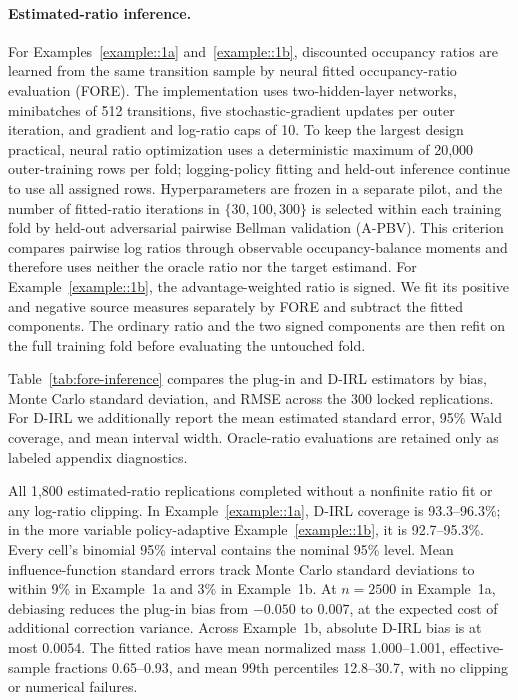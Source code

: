 \documentclass[12pt]{article}
\theoremstyle{plain}
\begin{document}
\paragraph{Estimated-ratio inference.}
For Examples~\ref{example::1a} and~\ref{example::1b}, discounted occupancy
ratios are learned from the same transition sample by neural fitted
occupancy-ratio evaluation (FORE). The implementation uses two-hidden-layer
networks, minibatches of 512 transitions, five stochastic-gradient updates per
outer iteration, and gradient and log-ratio caps of 10. To keep the largest
design practical, neural ratio optimization uses a deterministic maximum of
20,000 outer-training rows per fold; logging-policy fitting and held-out
inference continue to use all assigned rows.
Hyperparameters are frozen in a separate pilot, and the number of fitted-ratio
iterations in $\{30,100,300\}$ is selected within each training fold by held-out adversarial pairwise
Bellman validation (A-PBV). This criterion compares pairwise log ratios through
observable occupancy-balance moments and therefore uses neither the oracle
ratio nor the target estimand. For Example~\ref{example::1b}, the
advantage-weighted ratio is signed. We fit its positive and negative source
measures separately by FORE and subtract the fitted components. The ordinary
ratio and the two signed components are then refit on the full training fold
before evaluating the untouched fold.

Table~\ref{tab:fore-inference} compares the plug-in and D-IRL estimators by
bias, Monte Carlo standard deviation, and RMSE across the 300 locked
replications. For D-IRL we additionally report the mean estimated standard
error, 95\% Wald coverage, and mean interval width. Oracle-ratio evaluations
are retained only as labeled appendix diagnostics.


All 1,800 estimated-ratio replications completed without a nonfinite ratio fit
or any log-ratio clipping. In Example~\ref{example::1a}, D-IRL coverage is
93.3--96.3\%; in the more variable policy-adaptive
Example~\ref{example::1b}, it is 92.7--95.3\%. Every cell's binomial 95\%
interval contains the nominal 95\% level. Mean influence-function standard
errors track Monte Carlo standard deviations to within 9\% in Example~1a and
3\% in Example~1b. At $n=2500$ in Example~1a, debiasing reduces the plug-in
bias from $-0.050$ to $0.007$, at the expected cost of additional correction
variance. Across Example~1b, absolute D-IRL bias is at most $0.0054$.
The fitted ratios have mean normalized mass 1.000--1.001, effective-sample
fractions 0.65--0.93, and mean 99th percentiles 12.8--30.7, with no clipping
or numerical failures.
\end{document}
